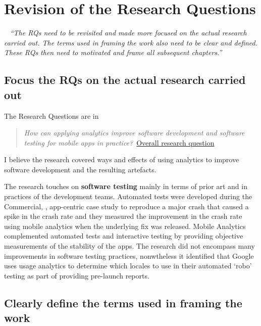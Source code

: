 \section{Revision of the Research Questions}~\label{corrections-rqs}
\emph{``The RQs need to be revisited and made more focused on the actual research carried out. The terms used in framing the work also need to be clear and defined. These RQs then need to motivated and frame all subsequent chapters.''}

\subsection{Focus the RQs on the actual research carried out}
The Research Questions are in 

\begin{quote}
  \emph{How can applying analytics improve software development and software testing for mobile apps in practice?}~\href{overall-research-question}{Overall research question}
\end{quote}

I believe the research covered ways and effects  of using  analytics to improve software development and the resulting artefacts.

The research touches on \textbf{software testing} mainly in terms of prior art and in practices of the development teams. Automated tests were developed during the Commercial, , app-centric case study to reproduce a major crash that caused a spike in the crash rate and they measured the improvement in the crash rate using mobile analytics when the underlying fix was released. Mobile Analytics complemented automated tests and interactive testing by providing objective measurements of the stability of the apps. The research did not encompass many improvements in software testing practices, nonwtheless it identified that Google uses usage analytics to determine which locales to use in their automated `robo' testing as part of providing pre-launch reports.

\subsection{Clearly define the terms used in framing the work}
